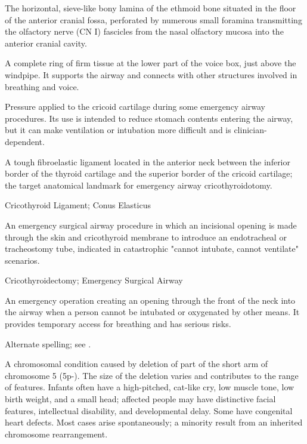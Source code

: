  The horizontal, sieve-like bony lamina of the ethmoid bone situated in the floor of the anterior cranial fossa, perforated by numerous small foramina transmitting the olfactory nerve (CN I) fascicles from the nasal olfactory mucosa into the anterior cranial cavity.

 A complete ring of firm tissue at the lower part of the voice box, just above the windpipe. It supports the airway and connects with other structures involved in breathing and voice.

 Pressure applied to the cricoid cartilage during some emergency airway procedures. Its use is intended to reduce stomach contents entering the airway, but it can make ventilation or intubation more difficult and is clinician-dependent.

 A tough fibroelastic ligament located in the anterior neck between the inferior border of the thyroid cartilage and the superior border of the cricoid cartilage; the target anatomical landmark for emergency airway cricothyroidotomy.

\synonyms
Cricothyroid Ligament; Conus Elasticus

 An emergency surgical airway procedure in which an incisional opening is made through the skin and cricothyroid membrane to introduce an endotracheal or tracheostomy tube, indicated in catastrophic "cannot intubate, cannot ventilate" scenarios.

\synonyms
Cricothyroidectomy; Emergency Surgical Airway

 An emergency operation creating an opening through the front of the neck into the airway when a person cannot be intubated or oxygenated by other means. It provides temporary access for breathing and has serious risks.

 Alternate spelling; see .

 A chromosomal condition caused by deletion of part of the short arm of chromosome 5 (5p-).
The size of the deletion varies and contributes to the range of features. Infants often have a
high-pitched, cat-like cry, low muscle tone, low birth weight, and a small head; affected people
may have distinctive facial features, intellectual disability, and developmental delay. Some have
congenital heart defects. Most cases arise spontaneously; a minority result from an inherited
chromosome rearrangement.

